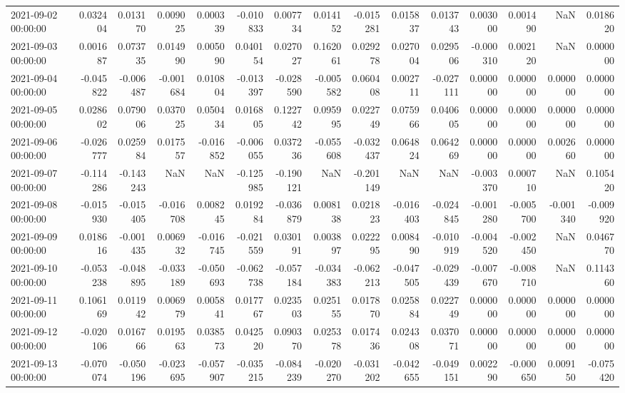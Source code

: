 \begin{tabular}{lrrrrrrrrrrrrrr}
2021-09-02 00:00:00 & 0.032404 & 0.013170 & 0.009025 & 0.000339 & -0.010833 & 0.007734 & 0.014152 & -0.015281 & 0.015837 & 0.013743 & 0.003000 & 0.001490 & NaN & 0.018620 \\
2021-09-03 00:00:00 & 0.001687 & 0.073735 & 0.014990 & 0.005090 & 0.040154 & 0.027027 & 0.162061 & 0.029278 & 0.027004 & 0.029506 & -0.000310 & 0.002120 & NaN & 0.000000 \\
2021-09-04 00:00:00 & -0.045822 & -0.006487 & -0.001684 & 0.010804 & -0.013397 & -0.028590 & -0.005582 & 0.060408 & 0.002711 & -0.027111 & 0.000000 & 0.000000 & 0.000000 & 0.000000 \\
2021-09-05 00:00:00 & 0.028602 & 0.079006 & 0.037025 & 0.050434 & 0.016805 & 0.122742 & 0.095995 & 0.022749 & 0.075966 & 0.040605 & 0.000000 & 0.000000 & 0.000000 & 0.000000 \\
2021-09-06 00:00:00 & -0.026777 & 0.025984 & 0.017557 & -0.016852 & -0.006055 & 0.037236 & -0.055608 & -0.032437 & 0.064824 & 0.064269 & 0.000000 & 0.000000 & 0.002660 & 0.000000 \\
2021-09-07 00:00:00 & -0.114286 & -0.143243 & NaN & NaN & -0.125985 & -0.190121 & NaN & -0.201149 & NaN & NaN & -0.003370 & 0.000710 & NaN & 0.105420 \\
2021-09-08 00:00:00 & -0.015930 & -0.015405 & -0.016708 & 0.008245 & 0.019284 & -0.036879 & 0.008138 & 0.021823 & -0.016403 & -0.024845 & -0.001280 & -0.005700 & -0.001340 & -0.009920 \\
2021-09-09 00:00:00 & 0.018616 & -0.001435 & 0.006932 & -0.016745 & -0.021559 & 0.030191 & 0.003897 & 0.022295 & 0.008490 & -0.010919 & -0.004520 & -0.002450 & NaN & 0.046770 \\
2021-09-10 00:00:00 & -0.053238 & -0.048895 & -0.033189 & -0.050693 & -0.062738 & -0.057184 & -0.034383 & -0.062213 & -0.047505 & -0.029439 & -0.007670 & -0.008710 & NaN & 0.114360 \\
2021-09-11 00:00:00 & 0.106169 & 0.011942 & 0.006979 & 0.005841 & 0.017767 & 0.023503 & 0.025155 & 0.017870 & 0.025884 & 0.022749 & 0.000000 & 0.000000 & 0.000000 & 0.000000 \\
2021-09-12 00:00:00 & -0.020106 & 0.016766 & 0.019563 & 0.038573 & 0.042520 & 0.090370 & 0.025378 & 0.017436 & 0.024308 & 0.037071 & 0.000000 & 0.000000 & 0.000000 & 0.000000 \\
2021-09-13 00:00:00 & -0.070074 & -0.050196 & -0.023695 & -0.057907 & -0.035215 & -0.084239 & -0.020270 & -0.031202 & -0.042655 & -0.049151 & 0.002290 & -0.000650 & 0.009150 & -0.075420 \\

\end{tabular}
